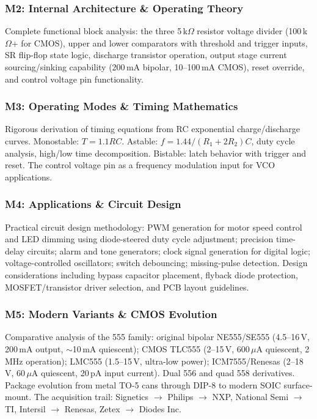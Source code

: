 \documentclass[11pt,letterpaper]{article}
\begin{document}
\subsubsection{M2: Internal Architecture \& Operating Theory}

Complete functional block analysis: the three 5\,k$\Omega$ resistor voltage divider (100\,k$\Omega$+ for CMOS), upper and lower comparators with threshold and trigger inputs, SR flip-flop state logic, discharge transistor operation, output stage current sourcing/sinking capability (200\,mA bipolar, 10--100\,mA CMOS), reset override, and control voltage pin functionality.

\subsubsection{M3: Operating Modes \& Timing Mathematics}

Rigorous derivation of timing equations from RC exponential charge/discharge curves. Monostable: $T = 1.1RC$. Astable: $f = 1.44 / (R_1 + 2R_2)C$, duty cycle analysis, high/low time decomposition. Bistable: latch behavior with trigger and reset. The control voltage pin as a frequency modulation input for VCO applications.

\subsubsection{M4: Applications \& Circuit Design}

Practical circuit design methodology: PWM generation for motor speed control and LED dimming using diode-steered duty cycle adjustment; precision time-delay circuits; alarm and tone generators; clock signal generation for digital logic; voltage-controlled oscillators; switch debouncing; missing-pulse detection. Design considerations including bypass capacitor placement, flyback diode protection, MOSFET/transistor driver selection, and PCB layout guidelines.

\subsubsection{M5: Modern Variants \& CMOS Evolution}

Comparative analysis of the 555 family: original bipolar NE555/SE555 (4.5--16\,V, 200\,mA output, $\sim$10\,mA quiescent); CMOS TLC555 (2--15\,V, 600\,$\mu$A quiescent, 2\,MHz operation); LMC555 (1.5--15\,V, ultra-low power); ICM7555/Renesas (2--18\,V, 60\,$\mu$A quiescent, 20\,pA input current). Dual 556 and quad 558 derivatives. Package evolution from metal TO-5 cans through DIP-8 to modern SOIC surface-mount. The acquisition trail: Signetics $\rightarrow$ Philips $\rightarrow$ NXP, National Semi $\rightarrow$ TI, Intersil $\rightarrow$ Renesas, Zetex $\rightarrow$ Diodes Inc.
\end{document}
